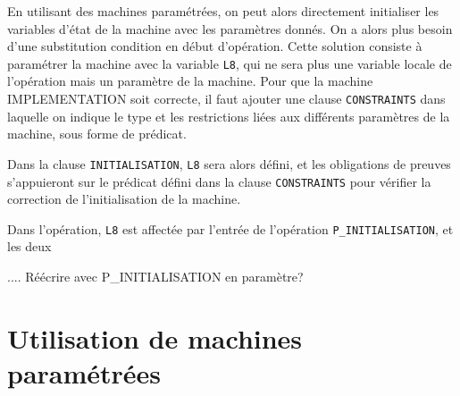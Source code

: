 \documentclass{cercles2}
\begin{document}
En utilisant des machines paramétrées, on peut alors directement
initialiser les variables d'état de la  machine avec les paramètres
donnés. On a alors plus besoin d'une substitution \textsf{condition}
en début d'opération. 
Cette solution consiste à paramétrer la machine avec la variable
\texttt{L8}, qui ne sera plus une variable locale de l'opération mais
un paramètre de la machine. 
Pour que la machine IMPLEMENTATION soit correcte, il faut ajouter une
clause \texttt{CONSTRAINTS} dans laquelle on indique le type et les
restrictions liées aux différents paramètres de la machine, sous forme
de prédicat.

Dans la clause \texttt{INITIALISATION}, \texttt{L8} sera alors défini,
et les obligations de preuves s'appuieront sur le prédicat défini dans
la clause \texttt{CONSTRAINTS} pour vérifier la correction de
l'initialisation de la machine.

Dans l'opération, \texttt{L8} est affectée par l'entrée de l'opération
\texttt{P\_INITIALISATION}, et les deux


....
Réécrire avec P\_INITIALISATION en paramètre?


\section{Utilisation de machines paramétrées}
\end{document}
